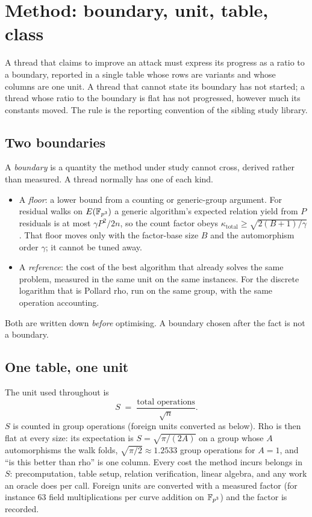 \section{Method: boundary, unit, table, class}
\label{sec:method}

A thread that claims to improve an attack must express its progress as
a ratio to a boundary, reported in a single table whose rows are
variants and whose columns are one unit. A thread that cannot state
its boundary has not started; a thread whose ratio to the boundary is
flat has not progressed, however much its constants moved. The rule is
the reporting convention of the sibling study
library.

\subsection{Two boundaries}

A \emph{boundary} is a quantity the method under study cannot cross,
derived rather than measured. A thread normally has one of each kind.

\begin{itemize}[leftmargin=1.2em,itemsep=0.3em]
\item A \emph{floor}: a lower bound from a counting or generic-group
  argument. For residual walks on $E(\mathbb{F}_{p^3})$ a generic algorithm's
  expected relation yield from $P$ residuals is at most $\gamma P^2/2n$,
  so the count factor obeys $\kappa_{\mathrm{total}}\ge\sqrt{2(B+1)/\gamma}$.
  That floor moves only with the factor-base size $B$ and the
  automorphism order $\gamma$; it cannot be tuned
  away.
\item A \emph{reference}: the cost of the best algorithm that already
  solves the same problem, measured in the same unit on the same
  instances. For the discrete logarithm that is Pollard rho, run on
  the same group, with the same operation accounting.
\end{itemize}

Both are written down \emph{before} optimising. A boundary chosen after
the fact is not a boundary.

\subsection{One table, one unit}

The unit used throughout is
\[
  S \;=\; \frac{\text{total operations}}{\sqrt{n}}.
\]
$S$ is counted in group operations (foreign units converted as below).
Rho is then flat at every size: its expectation is
$S=\sqrt{\pi/(2A)}$ on a group whose $A$ automorphisms the walk folds,
$\sqrt{\pi/2}\approx 1.2533$ group operations for $A=1$, and ``is this
better than rho'' is one column. Every cost the method incurs belongs in $S$:
precomputation, table setup, relation verification, linear algebra,
and any work an oracle does per call. Foreign units are converted with
a measured factor (for instance $63$ field multiplications per curve
addition on $\mathbb{F}_{p^3}$) and the factor is recorded.

